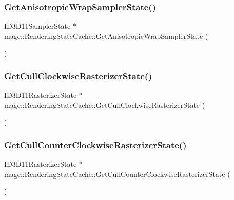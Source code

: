 \subsubsection{\texorpdfstring{Get\+Anisotropic\+Wrap\+Sampler\+State()}{GetAnisotropicWrapSamplerState()}}
{\footnotesize\ttfamily I\+D3\+D11\+Sampler\+State $\ast$ mage\+::\+Rendering\+State\+Cache\+::\+Get\+Anisotropic\+Wrap\+Sampler\+State (\begin{DoxyParamCaption}{ }\end{DoxyParamCaption})}

\hypertarget{structmage_1_1_rendering_state_cache_a4055aaf84813811b94ed741c07cbee3c}{}\label{structmage_1_1_rendering_state_cache_a4055aaf84813811b94ed741c07cbee3c} 
\subsubsection{\texorpdfstring{Get\+Cull\+Clockwise\+Rasterizer\+State()}{GetCullClockwiseRasterizerState()}}
{\footnotesize\ttfamily I\+D3\+D11\+Rasterizer\+State $\ast$ mage\+::\+Rendering\+State\+Cache\+::\+Get\+Cull\+Clockwise\+Rasterizer\+State (\begin{DoxyParamCaption}{ }\end{DoxyParamCaption})}

\hypertarget{structmage_1_1_rendering_state_cache_aa41c6a83a929c09f040dddbd4e21d5fb}{}\label{structmage_1_1_rendering_state_cache_aa41c6a83a929c09f040dddbd4e21d5fb} 
\subsubsection{\texorpdfstring{Get\+Cull\+Counter\+Clockwise\+Rasterizer\+State()}{GetCullCounterClockwiseRasterizerState()}}
{\footnotesize\ttfamily I\+D3\+D11\+Rasterizer\+State $\ast$ mage\+::\+Rendering\+State\+Cache\+::\+Get\+Cull\+Counter\+Clockwise\+Rasterizer\+State (\begin{DoxyParamCaption}{ }\end{DoxyParamCaption})}

